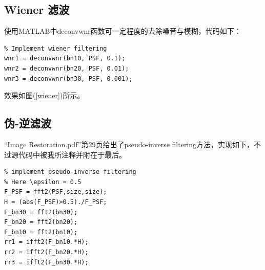\documentclass{article}
\begin{document}
\begin{multicols}{2}
\subsection{Wiener 滤波}
使用MATLAB中deconvwnr函数可一定程度的去除噪音与模糊，代码如下：
\begin{lstlisting}
% Implement wiener filtering
wnr1 = deconvwnr(bn10, PSF, 0.1);
wnr2 = deconvwnr(bn20, PSF, 0.01);
wnr3 = deconvwnr(bn30, PSF, 0.001);
\end{lstlisting}
效果如图(\ref{wiener})所示。
\subsection{伪-逆滤波}
“Image Restoration.pdf”第29页给出了pseudo-inverse filtering方法，实现如下，不过源代码中被我所注释并附在于最后。
\begin{lstlisting}
% implement pseudo-inverse filtering
% Here \epsilon = 0.5
F_PSF = fft2(PSF,size,size);
H = (abs(F_PSF)>0.5)./F_PSF;
F_bn30 = fft2(bn30);
F_bn20 = fft2(bn20);
F_bn10 = fft2(bn10);
rr1 = ifft2(F_bn10.*H);
rr2 = ifft2(F_bn20.*H);
rr3 = ifft2(F_bn30.*H);
\end{lstlisting}
\end{multicols}

\newpage
\end{document}
